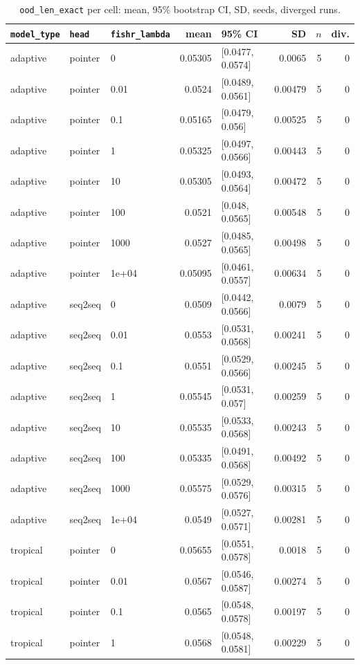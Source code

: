 \documentclass[10pt]{article}
\begin{document}
{\small
\begin{longtable}{lllrlrrr}
\caption{\texttt{ood\_len\_exact} per cell: mean, 95\% bootstrap CI, SD, seeds, diverged runs.}\label{tab:summary-ood_len_exact}\\
\toprule
\texttt{model\_type} & \texttt{head} & \texttt{fishr\_lambda} & mean & 95\% CI & SD & $n$ & div.\\
\midrule
\endhead
adaptive & pointer & 0 & 0.05305 & [0.0477, 0.0574] & 0.0065 & 5 & 0\\
adaptive & pointer & 0.01 & 0.0524 & [0.0489, 0.0561] & 0.00479 & 5 & 0\\
adaptive & pointer & 0.1 & 0.05165 & [0.0479, 0.056] & 0.00525 & 5 & 0\\
adaptive & pointer & 1 & 0.05325 & [0.0497, 0.0566] & 0.00443 & 5 & 0\\
adaptive & pointer & 10 & 0.05305 & [0.0493, 0.0564] & 0.00472 & 5 & 0\\
adaptive & pointer & 100 & 0.0521 & [0.048, 0.0565] & 0.00548 & 5 & 0\\
adaptive & pointer & 1000 & 0.0527 & [0.0485, 0.0565] & 0.00498 & 5 & 0\\
adaptive & pointer & 1e+04 & 0.05095 & [0.0461, 0.0557] & 0.00634 & 5 & 0\\
adaptive & seq2seq & 0 & 0.0509 & [0.0442, 0.0566] & 0.0079 & 5 & 0\\
adaptive & seq2seq & 0.01 & 0.0553 & [0.0531, 0.0568] & 0.00241 & 5 & 0\\
adaptive & seq2seq & 0.1 & 0.0551 & [0.0529, 0.0566] & 0.00245 & 5 & 0\\
adaptive & seq2seq & 1 & 0.05545 & [0.0531, 0.057] & 0.00259 & 5 & 0\\
adaptive & seq2seq & 10 & 0.05535 & [0.0533, 0.0568] & 0.00243 & 5 & 0\\
adaptive & seq2seq & 100 & 0.05335 & [0.0491, 0.0568] & 0.00492 & 5 & 0\\
adaptive & seq2seq & 1000 & 0.05575 & [0.0529, 0.0576] & 0.00315 & 5 & 0\\
adaptive & seq2seq & 1e+04 & 0.0549 & [0.0527, 0.0571] & 0.00281 & 5 & 0\\
tropical & pointer & 0 & 0.05655 & [0.0551, 0.0578] & 0.0018 & 5 & 0\\
tropical & pointer & 0.01 & 0.0567 & [0.0546, 0.0587] & 0.00274 & 5 & 0\\
tropical & pointer & 0.1 & 0.0565 & [0.0548, 0.0578] & 0.00197 & 5 & 0\\
tropical & pointer & 1 & 0.0568 & [0.0548, 0.0581] & 0.00229 & 5 & 0\\

\end{longtable}}
\end{document}
